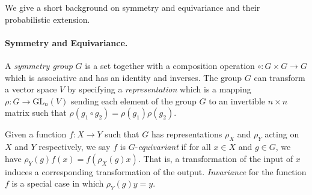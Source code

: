 We give a short background on  symmetry and equivariance and their probabilistic extension.
%
\paragraph{Symmetry and Equivariance.}\label{subsec:symmetry}
A \emph{symmetry group} $G$  is a set together with a composition operation $\circ \colon G \times G \to G$ which is associative and has an identity and inverses. The group $G$ can transform a vector space $V$ by specifying a \emph{representation} which is a mapping $\rho \colon G \to \mathrm{GL}_n(V)$ sending each element of the group $G$ to an invertible $n \times n$ matrix such that $\rho(g_1 \circ g_2) = \rho(g_1) \rho(g_2)$.  

Given a function $f \colon X \to Y$ such that $G$ has representations $\rho_X$ and $\rho_Y$ acting on $X$ and $Y$ respectively, we say $f$ is $G$-\emph{equivariant} if for all $x \in X$ and $g \in G$, we have $\rho_Y(g)f(x) = f(\rho_X(g) x )$.  That is, a transformation of the input of $x$ induces a corresponding transformation of the output.  \emph{Invariance} for the function $f$ is a special case in which $\rho_Y(g)y = y$. 



